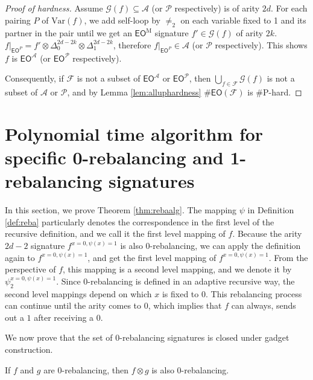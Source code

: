 \documentclass[a4paper,UKenglish,cleveref, autoref, thm-restate]{lipics-v2021}
\newcommand{\eo}[0]{\textsf{EO}}
\newcommand{\eom}[1][\text{M}]{\textsf{EO}^{#1}}
\newcommand{\ba}[1][0]{{{#1}-rebalancing}}
\begin{document}
\begin{proof}[Proof of hardness]
    Assume $\mathcal{G}(f)\subseteq\mathscr{A}$ (or $\mathscr{P}$ respectively) is of arity $2d$. For each pairing $P$ of $\text{Var}(f)$, we add self-loop by $\neq_2$ on each variable fixed to 1 and its partner in the pair until we get an $\eom$ signature $f'\in\mathcal{G}(f)$ of arity $2k$. $f|_{\eom[P]}=f'\otimes\Delta_0^{2d-2k}\otimes\Delta_1^{2d-2k}$, therefore  $f|_{\eom[P]}\in\mathscr{A}$ (or $\mathscr{P}$ respectively). This shows $f$ is $\eom[\mathscr{A}]$ (or $\eom[\mathscr{P}]$ respectively).

    Consequently, if $\mathcal{F}$ is not a subset of $\eom[\mathscr{A}]$ or $\eom[\mathscr{P}]$, then $\bigcup_{f\in\mathcal{F}}\mathcal{G}(f)$ is not a subset of $\mathscr{A}$ or $\mathscr{P}$, and by Lemma \ref{lem:alluphardness} $\#\eo(\mathcal{F})$ is \#P-hard. 
\end{proof}


\section{Polynomial time algorithm for specific 0-rebalancing and 1-rebalancing signatures}\label{balancing}

In this section, we prove Theorem \ref{thm:rebaalg}. The mapping $\psi$ in Definition \ref{def:reba} particularly denotes the correspondence in the first level of the recursive definition, and we call it the first level mapping of $f$. 
Because the arity $2d-2$ signature $f^{x=0,\psi(x)=1}$ is also \ba[0], we can apply the definition again to $f^{x=0,\psi(x)=1}$, and get the first level mapping of $f^{x=0,\psi(x)=1}$. From the perspective of $f$, this mapping is a second level mapping, and we denote it by $\psi_2^{x=0,\psi(x)=1}$. 
Since \ba[0] is defined in an adaptive recursive way, the second level mappings depend on which $x$ is fixed to $0$. 
This rebalancing process can continue until the arity comes to 0, which implies that $f$ can always, sends out a $1$ after receiving a $0$. 

We now prove that the set of \ba[0] signatures is closed under gadget construction.

\begin{lemma} \label{lem:ba-tensor-closed}
If $f$ and $g$ are \ba[0], then $f\otimes g$ is also \ba[0].
\end{lemma}
\end{document}
